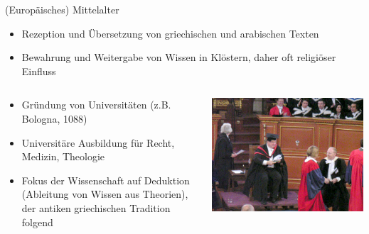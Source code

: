 \documentclass{beamer}
\begin{document}
\begin{frame}{(Europäisches) Mittelalter}

\begin{itemize}
    \item Rezeption und Übersetzung von griechischen und arabischen Texten
    \item Bewahrung und Weitergabe von Wissen in Klöstern, daher oft religiöser Einfluss
    
\end{itemize}

\begin{columns}[c]

\begin{column}{5cm}
\begin{itemize}
    \item Gründung von Universitäten (z.B. Bologna, 1088)
    \item 
    Universitäre Ausbildung für Recht, Medizin, Theologie
    \item 
    Fokus der Wissenschaft auf Deduktion (Ableitung von Wissen aus Theorien), der antiken griechischen Tradition folgend

\end{itemize}
    
\end{column}



    \begin{column}{5cm}
\includegraphics[width=\textwidth]{Oxfordceremony.jpg}    
\end{column}

\end{columns}


\end{frame}
\end{document}

